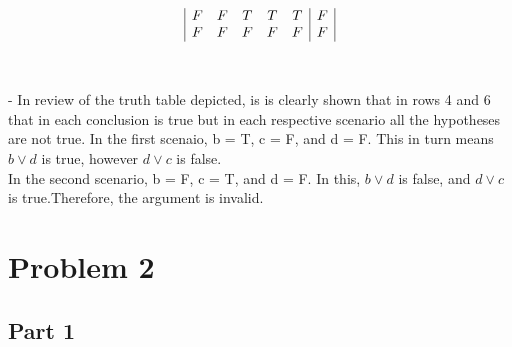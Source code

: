 \documentclass{amsart}
\theoremstyle{definition}
\theoremstyle{Exercise}
\theoremstyle{remark}
\theoremstyle{rule}
\numberwithin{equation}{section}
\begin{document}
\begin{enumerate}[label=(\alph*)]
\begin{displaymath}
\begin{array}{| c c c c c | c |}
    F & F & T & T & T & F\\
    F & F & F & F & F & F\\
  \end{array}
\end{displaymath}
\\\\
- In review of the truth table depicted, is is clearly shown that in rows 4 and 6 that in each conclusion is true but in each respective scenario all the hypotheses are not true.
  In the first scenaio, b = T, c = F, and d = F. This in turn means $b \lor d $ is true, however $d \lor c $ is false.\\In the second scenario, b = F, c = T, and d = F. In this, 
  $b \lor d $ is false, and $d \lor c $ is true.Therefore, the argument is invalid.\\
    \end{enumerate}
 \newpage

\vspace*{0.5in}
\section*{Problem 2}
\subsection*{Part 1}
\end{document}
